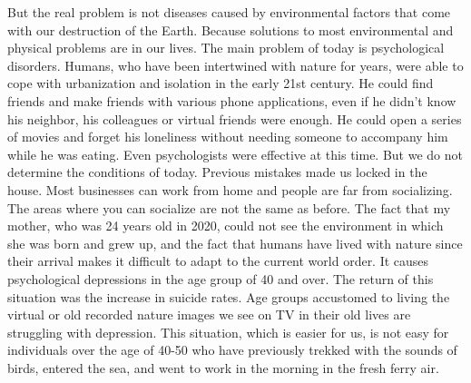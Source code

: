 \documentclass[]{book}
\begin{document}
But the real problem is not diseases caused by environmental factors that come with our destruction of the Earth. Because solutions to most environmental and physical problems are in our lives. The main problem of today is psychological disorders. Humans, who have been intertwined with nature for years, were able to cope with urbanization and isolation in the early 21st century. He could find friends and make friends with various phone applications, even if he didn't know his neighbor, his colleagues or virtual friends were enough. He could open a series of movies and forget his loneliness without needing someone to accompany him while he was eating. Even psychologists were effective at this time. But we do not determine the conditions of today. Previous mistakes made us locked in the house. Most businesses can work from home and people are far from socializing. The areas where you can socialize are not the same as before. The fact that my mother, who was 24 years old in 2020, could not see the environment in which she was born and grew up, and the fact that humans have lived with nature since their arrival makes it difficult to adapt to the current world order. It causes psychological depressions in the age group of 40 and over. The return of this situation was the increase in suicide rates. Age groups accustomed to living the virtual or old recorded nature images we see on TV in their old lives are struggling with depression. This situation, which is easier for us, is not easy for individuals over the age of 40-50 who have previously trekked with the sounds of birds, entered the sea, and went to work in the morning in the fresh ferry air.
\end{document}
